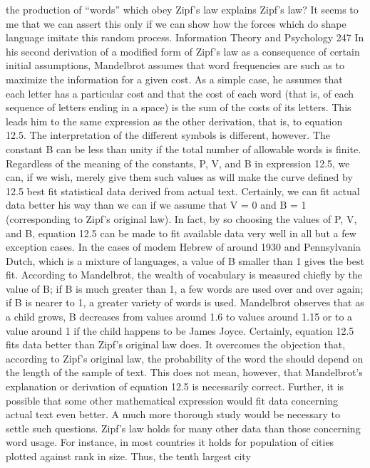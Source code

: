 {{{{{{{{{{{{the production of “words” which obey Zipf’s law explains Zipf’s
law? It seems to me that we can assert this only if we can show how
the forces which do shape language imitate this random process.
Information Theory and Psychology
247
In his second derivation of a modified form of Zipf’s law as a
consequence of certain initial assumptions, Mandelbrot assumes
that word frequencies are such as to maximize the information for
a given cost. As a simple case, he assumes that each letter has a
particular cost and that the cost of each word (that is, of each
sequence of letters ending in a space) is the sum of the costs of its
letters. This leads him to the same expression as the other derivation,
that is, to equation 12.5. The interpretation of the different
symbols is different, however. The constant B can be less than
unity if the total number of allowable words is finite.
Regardless of the meaning of the constants, P, V, and B in
expression 12.5, we can, if we wish, merely give them such values
as will make the curve defined by 12.5 best fit statistical data
derived from actual text. Certainly, we can fit actual data better
his way than we can if we assume that V = 0 and B = 1 (corresponding
to Zipf’s original law). In fact, by so choosing the values
of P, V, and B, equation 12.5 can be made to fit available data very
well in all but a few exception cases. In the cases of modem
Hebrew of around 1930 and Pennsylvania Dutch, which is a
mixture of languages, a value of B smaller than 1 gives the best fit.
According to Mandelbrot, the wealth of vocabulary is measured
chiefly by the value of B; if B is much greater than 1, a few words
are used over and over again; if B is nearer to 1, a greater variety
of words is used. Mandelbrot observes that as a child grows, B
decreases from values around 1.6 to values around 1.15 or to a
value around 1 if the child happens to be James Joyce.
Certainly, equation 12.5 fits data better than Zipf’s original law
does. It overcomes the objection that, according to Zipf’s original
law, the probability of the word the should depend on the length
of the sample of text. This does not mean, however, that Mandelbrot’s
explanation or derivation of equation 12.5 is necessarily
correct. Further, it is possible that some other mathematical
expression would fit data concerning actual text even better. A
much more thorough study would be necessary to settle such
questions.
Zipf’s law holds for many other data than those concerning
word usage. For instance, in most countries it holds for population
of cities plotted against rank in size. Thus, the tenth largest city
}}}}}}}}}}}}
